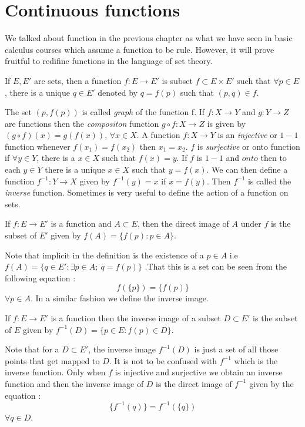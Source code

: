 \chapter{Continuous functions}
We talked about function in the previous chapter as what we have seen in basic calculus courses
which assume a function to be rule. However, it will prove fruitful to redifine functions in the
language of set theory.

\begin{Definition}[name=Functions]
    If $E,E'$ are sets, then a function $f : E \to E'$ is subset $f \subset E \times E'$ such that
    $\forall p \in E$, there is a unique $q \in E'$ denoted by $q = f(p)$ such that $(p,q) \in f$.
\end{Definition}
The set $(p,f(p))$ is called \emph{graph} of the function f. If $f : X \to Y$ and $g : Y \to Z$ are
functions then the \emph{compositon} function $g \circ f : X \to Z$ is given by $(g \circ f)(x) =
g(f(x))$, $\forall x \in X$. A function $f : X \to Y$ is an \emph{injective} or $1-1$ function whenever
$f(x_1) = f(x_2)$ then $x_1 = x_2$. $f$ is \emph{surjective} or onto function if $\forall y \in Y$, there
is a $x \in X$ such that $f(x) = y$. If $f$ is $1-1$ and $onto$ then to each $y \in Y$ there is a
unique $x \in X$ such that $y = f(x)$. We can then define a function $f^{-1} : Y \to X$ given by
$f^{-1}(y) = x$ if $x = f(y)$. Then $f^{-1}$ is called the \emph{inverse} function. Sometimes is
very useful to define the action of a function on sets. 

\begin{Definition}[name=Direct Image]
    If $f : E \to E'$ is a function and $A \subset E$, then the direct image of $A$ under $f$ is the
    subset of $E'$ given by $f(A) = \left.\lbrace f(p) : p \in A \rbrace\right.$.
\end{Definition}
Note that implicit in the definition is the existence of a $p \in A$ i.e $f(A) = \left.\lbrace q \in
E' : \exists p \in A; \ q = f(p) \rbrace\right.$ .That this is a set can be seen from the following
equation : \[ f\left(\lbrace p \rbrace \right) = \lbrace f(p) \rbrace\] $\forall p \in A$. In a
similar fashion we define the inverse image. 

\begin{Definition}[name=Inverse Image]
    If $f : E \to E'$ is a function then the inverse image of a subset $D \subset E'$ is the subset of
    $E$ given by $f^{-1}(D) = \left.\lbrace p \in E : f(p) \in D \rbrace\right.$.
\end{Definition}
Note that for a $D \subset E'$, the inverse image $f^{-1}(D)$ is just a set of all those points that
get mapped to $D$. It is not to be confused with $f^{-1}$ which is the inverse function. Only when
$f$ is injective and surjective we obtain an inverse function and then the inverse image of $D$ is
the direct image of $f^{-1}$ given by the equation : 
\[ \lbrace f^{-1}(q) \rbrace = f^{-1}\left(\lbrace q \rbrace\right) \] $\forall q \in D$. 

